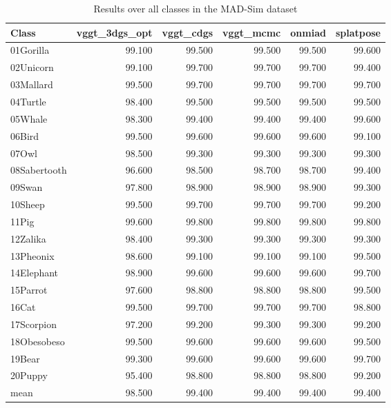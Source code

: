 \begin{table}[!htbp]
\centering
\scriptsize
\setlength{\tabcolsep}{4pt}
\renewcommand{\arraystretch}{0.95}
\begin{tabular}{l r r r r r}
\toprule
\textbf{Class} & \textbf{vggt\_3dgs\_opt} & \textbf{vggt\_cdgs} & \textbf{vggt\_mcmc} & \textbf{onmiad} & \textbf{splatpose} \\
\midrule
01Gorilla & 99.100 & 99.500 & 99.500 & 99.500 & 99.600 \\
02Unicorn & 99.100 & 99.700 & 99.700 & 99.700 & 99.400 \\
03Mallard & 99.500 & 99.700 & 99.700 & 99.700 & 99.700 \\
04Turtle & 98.400 & 99.500 & 99.500 & 99.500 & 99.500 \\
05Whale & 98.300 & 99.400 & 99.400 & 99.400 & 99.600 \\
06Bird & 99.500 & 99.600 & 99.600 & 99.600 & 99.100 \\
07Owl & 98.500 & 99.300 & 99.300 & 99.300 & 99.300 \\
08Sabertooth & 96.600 & 98.500 & 98.700 & 98.700 & 99.400 \\
09Swan & 97.800 & 98.900 & 98.900 & 98.900 & 99.300 \\
10Sheep & 99.500 & 99.700 & 99.700 & 99.700 & 99.200 \\
11Pig & 99.600 & 99.800 & 99.800 & 99.800 & 99.800 \\
12Zalika & 98.400 & 99.300 & 99.300 & 99.300 & 99.300 \\
13Pheonix & 98.600 & 99.100 & 99.100 & 99.100 & 99.500 \\
14Elephant & 98.900 & 99.600 & 99.600 & 99.600 & 99.700 \\
15Parrot & 97.600 & 98.800 & 98.800 & 98.800 & 99.500 \\
16Cat & 99.500 & 99.700 & 99.700 & 99.700 & 98.800 \\
17Scorpion & 97.200 & 99.200 & 99.300 & 99.300 & 99.200 \\
18Obesobeso & 99.500 & 99.600 & 99.600 & 99.600 & 99.500 \\
19Bear & 99.300 & 99.600 & 99.600 & 99.600 & 99.700 \\
20Puppy & 95.400 & 98.800 & 98.800 & 98.800 & 99.200 \\
\midrule
mean & 98.500 & 99.400 & 99.400 & 99.400 & 99.400 \\
\bottomrule
\end{tabular}
\caption{Results over all classes in the MAD-Sim dataset}
\label{tab:results\_mad}
\end{table}